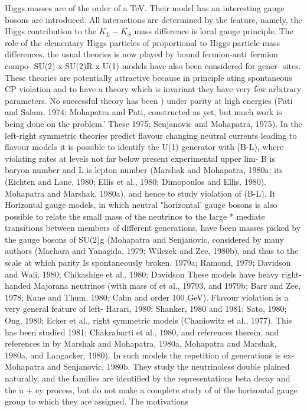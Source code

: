 \documentclass[twoside]{article}
\begin{document}
{Higgs masses are of the order of a TeV. Their model has an interesting gauge bosons are introduced. All interactions are determined by the
feature, namely, the Higgs contribution to the $K_{L}-K_{S}$ mass difference is local gauge principle. The role of the elementary Higgs particles of
proportional to Higgs particle mass differences. the usual theories is now played by bound fermion-anti~fermion compo-
SU(2) x SU(2)R x U(1) models have also been considered for gener- sites. These theories are potentially attractive because in principle
ating spontaneous CP violation and to have a theory which is invariant
they have very few arbitrary parameters. No successful theory has been
)
under parity at high energies (Pati and Salam, 1974; Mohapatra and Pati, constructed as yet, but much work is being done on the problem.’ These
1975; Senjanovic and Mohapatra, 1975). In the left-right symmetric theories predict flavour changing neutral currents leading to flavour
models it is possible to identify the U(1) generator with {(B-L), where violating rates at levels not far below present experimental upper lim-
B is baryon number and L is lepton number (Marshak and Mohapatra, 1980a; its (Eichten and Lane, 1980; Ellis et al., 1980; Dimopoulos and Ellis, 1980).
Mohapatra and Marshak, 1980a), and hence to study violation of (B-L). It Horizontal gauge models, in which neutral "horizontal' gauge bosons
is also possible to relate the small mass of the neutrinos to the large * mediate transitions between members of different generations, have been
masses picked by the gauge bosons of SU(2)g (Mohapatra and Senjanovic, considered by many authors (Maehara and Yanagida, 1979; Wilczek and Zee,
1980b), and thus to the scale at which parity Is spontaneously broken. 1979a; Ramond, 1979; Davidson and Wali, 1980; Chikashige et al., 1980; Davidson
These models have heavy right-handed Majorana neutrinos (with mass of et al., 19793, and 1979b; Barr and Zee, 1978; Kane and Thum, 1980; Cahn and
order 100 GeV). Flavour violation is a very general feature of left- Harari, 1980; Shanker, 1980 and 1981; Sato, 1980; Ong, 1980; Ecker et al.,
right symmetric models (Chaniowitz et al., 1977). This has been studied 1981; Chakrabarti et al., 1980, and references therein, and references in
by Marshak and Mohapatra, 1980a, Mohapatra and Marshak, 1980a, and Langacker, 1980). In such models the repetition of generations is ex-
Mohapatra and Senjanovic, 1980b. They study the neutrinoless double plained naturally, and the families are identified by the representations
beta decay and the u + ey process, but do not make a complete study of of the horizontal gauge group to which they are assigned. The motivations
}}
\end{document}

